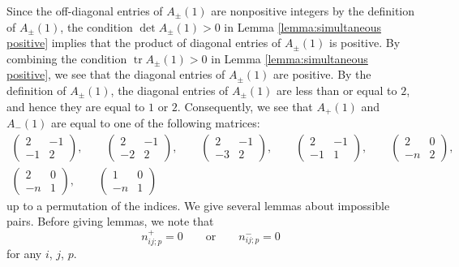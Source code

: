 \documentclass[10pt,a4paper]{amsart}
\numberwithin{equation}{section}
\theoremstyle{definition}
\DeclareMathOperator{\tr}{tr}
\begin{document}
Since the off-diagonal entries of $A_\pm(1)$ are nonpositive integers by
the definition of $A_\pm(1)$,
the condition $\det A_\pm(1) > 0$ in Lemma \ref{lemma:simultaneous positive} implies that
the product of diagonal entries of $A_\pm(1)$ is positive.
By combining the condition $\tr A_\pm(1) > 0$ in Lemma \ref{lemma:simultaneous positive},
we see that the diagonal entries of $A_\pm(1)$ are positive.
By the definition of $A_\pm(1)$, the diagonal entries of $A_\pm(1)$ are less than or equal to $2$,
and hence they are equal to $1$ or $2$.
Consequently, we see that $A_+(1)$ and~$A_-(1)$ are equal to one of the following matrices:
\begin{gather*}
 \begin{pmatrix}
 2 & -1 \\
 -1 & 2
 \end{pmatrix},\qquad
 \begin{pmatrix}
 2 & -1 \\
 -2 & 2
 \end{pmatrix},\qquad
 \begin{pmatrix}
 2 & -1 \\
 -3 & 2
 \end{pmatrix},\qquad
 \begin{pmatrix}
 2 & -1 \\
 -1 & 1
 \end{pmatrix},\qquad
 \begin{pmatrix}
 2 & 0 \\
 -n & 2
 \end{pmatrix},\\
 \begin{pmatrix}
 2 & 0 \\
 -n & 1
 \end{pmatrix},\qquad
 \begin{pmatrix}
 1 & 0 \\
 -n & 1
 \end{pmatrix}
\end{gather*}
up to a permutation of the indices.
We give several lemmas about impossible pairs.
Before giving lemmas, we note that
\begin{equation}\label{eq:Y2}
 n_{ij;p}^{+} = 0 \qquad \text{or} \qquad n_{ij;p}^{-}=0
\end{equation}
for any $i$, $j$, $p$.
\end{document}
